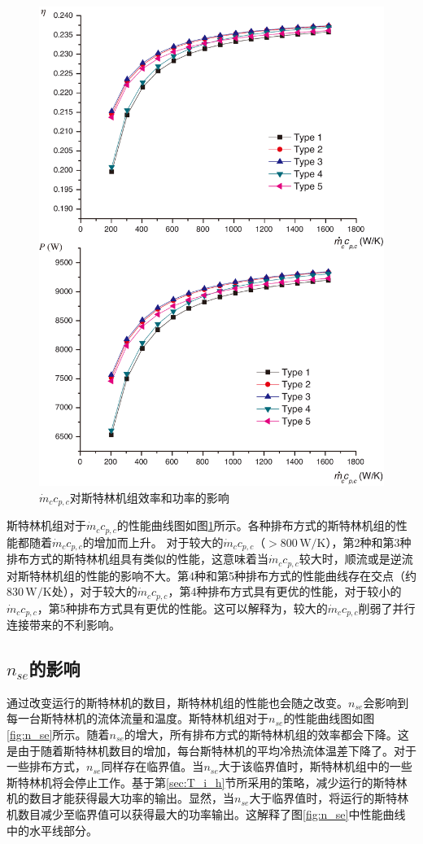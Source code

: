 \noindent \begin{figure}[htbp]
\begin{center}
	\includegraphics[width = 0.7\columnwidth]{fig/qm_ccp_c}
	\caption{$\dot{m}_cc_{p,c}$对斯特林机组效率和功率的影响}
	\label{fig:qm_ccp_c}
\end{center}
\end{figure}
斯特林机组对于$\dot{m}_cc_{p,c}$的性能曲线图如图\ref{fig:qm_ccp_c}所示。各种排布方式的斯特林机组的性能都随着$\dot{m}_cc_{p,c}$的增加而上升。
对于较大的$\dot{m}_cc_{p,c}$（$> 800\,\mathrm{W/K}$），第2种和第3种排布方式的斯特林机组具有类似的性能，这意味着当$\dot{m}_cc_{p,c}$较大时，顺流或是逆流对斯特林机组的性能的影响不大。第4种和第5种排布方式的性能曲线存在交点（约$830\,\mathrm{W/K}$处），对于较大的$\dot{m}_cc_{p,c}$，第4种排布方式具有更优的性能，对于较小的$\dot{m}_cc_{p,c}$，第5种排布方式具有更优的性能。这可以解释为，较大的$\dot{m}_cc_{p,c}$削弱了并行连接带来的不利影响。

\subsection{$n_{se}$的影响}

通过改变运行的斯特林机的数目，斯特林机组的性能也会随之改变。$n_{se}$会影响到每一台斯特林机的流体流量和温度。斯特林机组对于$n_{se}$的性能曲线图如图\ref{fig:n_se}所示。随着$n_{se}$的增大，所有排布方式的斯特林机组的效率都会下降。这是由于随着斯特林机数目的增加，每台斯特林机的平均冷热流体温差下降了。对于一些排布方式，$n_{se}$同样存在临界值。当$n_{se}$大于该临界值时，斯特林机组中的一些斯特林机将会停止工作。基于第\ref{sec:T_i_h}节所采用的策略，减少运行的斯特林机的数目才能获得最大功率的输出。显然，当$n_{se}$大于临界值时，将运行的斯特林机数目减少至临界值可以获得最大的功率输出。这解释了图\ref{fig:n_se}中性能曲线中的水平线部分。

